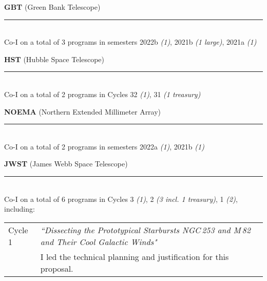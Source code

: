 \documentclass[11pt]{article}
\makeatletter
\def\vhrulefill#1{\leavevmode\leaders\hrule\@height#1\hfill \kern\z@}
\makeatother
\begin{document}
{\bf GBT} {\small (Green Bank Telescope)} \vhrulefill{0.5pt}\\
Co-I on a total of 3 programs in semesters 2022b {\em(1)}, 2021b {\em(1 large)}, 2021a {\em(1)}


{\bf HST} {\small (Hubble Space Telescope)} \vhrulefill{0.5pt}\\
Co-I on a total of 2 programs in Cycles 32 {\em(1)}, 31 {\em(1 treasury)}


{\bf NOEMA} {\small (Northern Extended Millimeter Array)} \vhrulefill{0.5pt}\\
Co-I on a total of 2 programs in semesters 2022a {\em(1)}, 2021b {\em(1)}


{\bf JWST} {\small (James Webb Space Telescope)} \vhrulefill{0.5pt}\\
Co-I on a total of  6 programs in Cycles 3 {\em(1)}, 2 {\em(3 incl. 1 treasury)}, 1 {\em(2)}, including:
\vspace{-9pt}
\begin{longtable}{p{}p{}}
Cycle 1 &  \textit{``Dissecting the Prototypical Starbursts NGC\,253 and M\,82 and Their Cool Galactic Winds"}\\
& {\small I led the technical planning and justification for this proposal.}\\
\end{longtable}
\vspace{-15pt}
\end{document}
